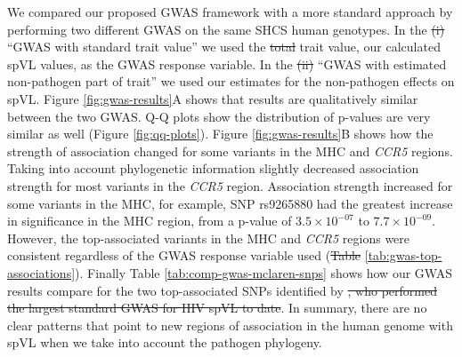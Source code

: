 \documentclass[12pt]{article} %
\providecommand{\DIFadd}[1]{{\protect\color{blue}\uwave{#1}}} %
\providecommand{\DIFdel}[1]{{\protect\color{red}\sout{#1}}}                      %
\providecommand{\DIFaddbegin}{} %
\providecommand{\DIFaddend}{} %
\providecommand{\DIFdelbegin}{} %
\providecommand{\DIFdelend}{} %
\newcommand{\DIFscaledelfig}{0.5}
\newlength{\DIFdelgraphicswidth} %
\newlength{\DIFdelgraphicsheight} %
\newcommand{\DIFaddincludegraphics}[2][]{{\color{blue}\fbox{\DIFOincludegraphics[#1]{#2}}}} %
\newcommand{\DIFdelincludegraphics}[2][]{%
\sbox{\DIFdelgraphicsbox}{\DIFOincludegraphics[#1]{#2}}%
\settoboxwidth{\DIFdelgraphicswidth}{\DIFdelgraphicsbox} %
\settoboxtotalheight{\DIFdelgraphicsheight}{\DIFdelgraphicsbox} %
\scalebox{\DIFscaledelfig}{%
\parbox[b]{\DIFdelgraphicswidth}{\usebox{\DIFdelgraphicsbox}\\[-\baselineskip] \rule{\DIFdelgraphicswidth}{0em}}\llap{\resizebox{\DIFdelgraphicswidth}{\DIFdelgraphicsheight}{%
\setlength{\unitlength}{\DIFdelgraphicswidth}%
\begin{picture}(1,1)%
\thicklines\linethickness{2pt} %
{\color[rgb]{1,0,0}\put(0,0){\framebox(1,1){}}}%
{\color[rgb]{1,0,0}\put(0,0){\line( 1,1){1}}}%
{\color[rgb]{1,0,0}\put(0,1){\line(1,-1){1}}}%
\end{picture}%
}\hspace*{3pt}}} %
} %
\DeclareRobustCommand{\DIFaddbegin}{\DIFOaddbegin \let\includegraphics\DIFaddincludegraphics} %
\DeclareRobustCommand{\DIFaddend}{\DIFOaddend \let\includegraphics\DIFOincludegraphics} %
\DeclareRobustCommand{\DIFdelbegin}{\DIFOdelbegin \let\includegraphics\DIFdelincludegraphics} %
\DeclareRobustCommand{\DIFdelend}{\DIFOaddend \let\includegraphics\DIFOincludegraphics} %
\begin{document}
\begin{doublespace}
We compared our proposed GWAS framework with a more standard approach by performing two different GWAS on the same SHCS human genotypes. In the \DIFdelbegin \DIFdel{(i) }\DIFdelend ``GWAS with standard trait value'' we used the \DIFdelbegin \DIFdel{total }\DIFdelend \DIFaddbegin \DIFadd{unmodified }\DIFaddend trait value, our calculated spVL values, as the GWAS response variable. In the \DIFdelbegin \DIFdel{(ii) }\DIFdelend ``GWAS with estimated non-pathogen part of trait'' we used our estimates for the non-pathogen effects on spVL. Figure \ref{fig:gwas-results}A shows that results are qualitatively similar between the two GWAS. Q-Q plots show the distribution of p-values are very similar as well (Figure \ref{fig:qq-plots}). Figure \ref{fig:gwas-results}B shows how the strength of association changed for some variants in the MHC and \emph{CCR5} regions. Taking into account phylogenetic information slightly decreased association strength for most variants in the \emph{CCR5} region. Association strength increased for some variants in the MHC, for example, SNP rs9265880 had the greatest increase in significance in the MHC region, from a p-value of $3.5 \times 10^{-07}$ to $7.7 \times 10^{-09}$. However, the top-associated variants in the MHC and \emph{CCR5} regions were consistent regardless of the GWAS response variable used (\DIFdelbegin \DIFdel{Table }\DIFdelend \DIFaddbegin \DIFadd{Figure }\DIFaddend \ref{tab:gwas-top-associations}). Finally Table \ref{tab:comp-gwas-mclaren-snps} shows how our GWAS results compare for the two top-associated SNPs identified by \citet{McLaren2015}\DIFdelbegin \DIFdel{, who performed the largest standard GWAS for HIV spVL to date}\DIFdelend . In summary, there are no clear patterns that point to new regions of association in the human genome with spVL when we take into account the pathogen phylogeny.


\end{doublespace}
\end{document}
